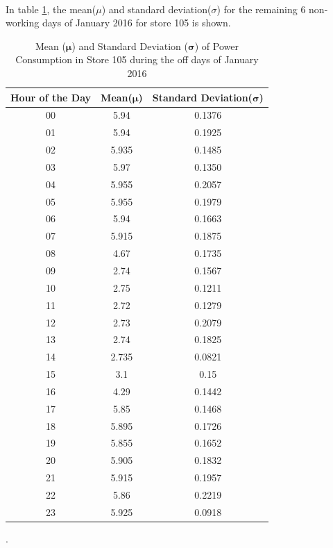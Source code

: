 \documentclass[12pt]{article}
\begin{document}
\paragraph{} In table \ref{table:studies1}, the mean($\mu$) and standard deviation($\sigma$) for the remaining 6 non-working days of January 2016 for store 105 is shown. 

\begin{table}[H]
	\centering
	{\renewcommand{\arraystretch}{1.0} 
		\begin{tabular}{|c|c|c|}
			\hline %
			Hour of the Day & Mean($\mathbf{\mu}$) & Standard Deviation($\mathbf{\sigma}$)\\
			\hline	%
			00 & 5.94 &0.1376 \\ \hline  %
			01 &5.94  & 0.1925 \\ \hline %
			02 &5.935  &0.1485 \\  \hline  %
			03 & 5.97 & 0.1350\\ \hline	%
			04 & 5.955 &0.2057  \\ \hline  %
			05 & 5.955 & 0.1979 \\ \hline %
			06 & 5.94 &0.1663 \\  \hline  %
			07 & 5.915 &0.1875\\ \hline	%
			08 & 4.67 &0.1735 \\ \hline	%
			09 & 2.74 & 0.1567 \\ \hline  %
			10 &2.75 &0.1211 \\ \hline %
			11 & 2.72 &0.1279 \\  \hline  %
			12 & 2.73 &0.2079 \\ \hline	%
			13 &2.74 &0.1825  \\ \hline %
			14 & 2.735 &0.0821 \\  \hline  %
			15 & 3.1 &0.15 \\ \hline	%
			16 &4.29 & 0.1442 \\ \hline %
			17 &5.85  &0.1468 \\  \hline  %
			18 & 5.895 &0.1726 \\ \hline
			19 &5.855  & 0.1652 \\ \hline %
			20 &5.905   &0.1832 \\  \hline  %
			21 & 5.915 &0.1957 \\ \hline	%
			22 &5.86 &0.2219  \\ \hline %
			23 &5.925  &0.0918 \\  \hline  %
		\end{tabular}
	}
	\caption{Mean ($\mathbf{\mu}$) and Standard Deviation ($\mathbf{\sigma}$) of Power Consumption in Store 105 during the off days of January 2016}.
	\label{table:studies1}
\end{table}
\end{document}
